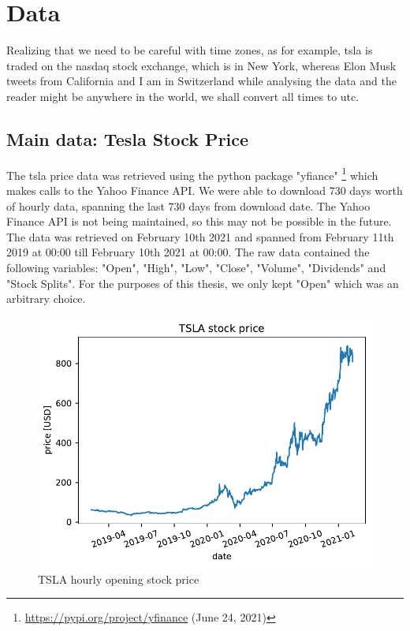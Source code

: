 \chapter{Data}
\label{chap:data}
Realizing that we need to be careful with time zones, as for example, \acrshort{tsla} is traded on the \Gls{nasdaq} stock exchange, which is in New York, whereas Elon Musk tweets from California and I am in Switzerland while analysing the data and the reader might be anywhere in the world, we shall convert all times to \Gls{utc}.
\section{Main data: Tesla Stock Price}
The \acrshort{tsla} price data was retrieved using the \Gls{python} package "yfiance" \footnote{\url{https://pypi.org/project/yfinance} (June 24, 2021)} which makes calls to the Yahoo Finance \Gls{API}. We were able to download 730 days worth of hourly data, spanning the last 730 days from download date. The Yahoo Finance \Gls{API} is not being maintained, so this may not be possible in the future. The data was retrieved on February 10th 2021 and spanned from February 11th 2019 at 00:00 till February 10th 2021 at 00:00.
The raw data contained the following variables: "Open", "High", "Low", "Close", "Volume", "Dividends" and "Stock Splits".
For the purposes of this thesis, we only kept "Open" which was an arbitrary choice.

\begin{figure}[h]
	\centering
	\includegraphics[width=\textwidth]{img/img_tsla.pdf}
	\caption{TSLA hourly opening stock price}
	\label{fig:tsla_open}
\end{figure}



